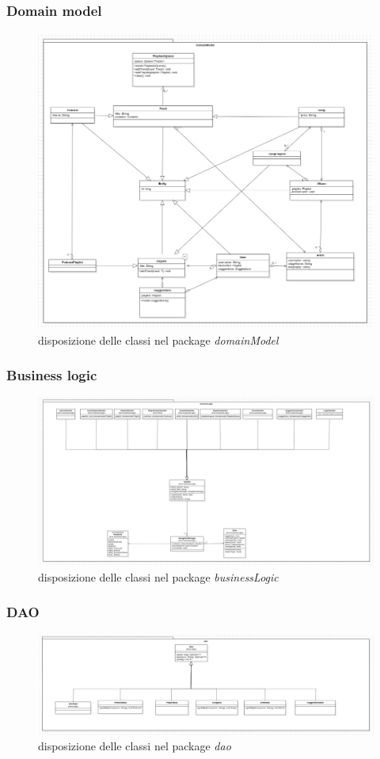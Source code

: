 \documentclass{article}
\begin{document}
  \subsubsection{Domain model}
  \begin{figure}[H]
    \centering
    \includegraphics[width=0.5\linewidth]{model01.png} %
    \caption{disposizione delle classi nel package \textit{domainModel}}
    \label{fig:domainModel}
  \end{figure}

  \subsubsection{Business logic}
  \begin{figure}[H]
    \centering
    \includegraphics[width=0.5\linewidth]{logic01.png} %
    \caption{disposizione delle classi nel package \textit{businessLogic}}
    \label{fig:businessLogic}
  \end{figure}

  \subsubsection{DAO}
  \begin{figure}[H]
    \centering
    \includegraphics[width=0.5\linewidth]{dao01.png} %
    \caption{disposizione delle classi nel package \textit{dao}}
    \label{fig:DAO}
  \end{figure}
\end{document}
